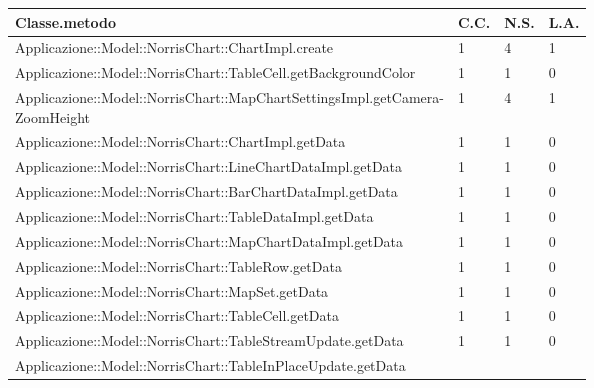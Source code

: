 
\begin{longtabu} spread 1cm [c]{|p{11cm}|p{1cm}|p{1cm}|p{1cm}|}
					\hline
					\rowfont{\bf \centering}
					Classe.metodo &
					C.C. &
					N.S.  &
					L.A. 
					\\
					\hline
					\endhead
            
					\parbox[t]{4cm}{Applicazione::Model::NorrisChart::ChartImpl.create} &
                1 &
                4 &
                1\\\hline \parbox[t]{4cm}{Applicazione::Model::NorrisChart::TableCell.getBackgroundColor} &
                1 &
                1 &
                0\\\hline \parbox[t]{4cm}{Applicazione::Model::NorrisChart::MapChartSettingsImpl.getCamera-\\ZoomHeight} &
                1 &
                4 &
                1\\\hline \parbox[t]{4cm}{Applicazione::Model::NorrisChart::ChartImpl.getData} &
                1 &
                1 &
                0\\\hline \parbox[t]{4cm}{Applicazione::Model::NorrisChart::LineChartDataImpl.getData} &
                1 &
                1 &
                0\\\hline \parbox[t]{4cm}{Applicazione::Model::NorrisChart::BarChartDataImpl.getData} &
                1 &
                1 &
                0\\\hline \parbox[t]{4cm}{Applicazione::Model::NorrisChart::TableDataImpl.getData} &
                1 &
                1 &
                0\\\hline \parbox[t]{4cm}{Applicazione::Model::NorrisChart::MapChartDataImpl.getData} &
                1 &
                1 &
                0\\\hline \parbox[t]{4cm}{Applicazione::Model::NorrisChart::TableRow.getData} &
                1 &
                1 &
                0\\\hline \parbox[t]{4cm}{Applicazione::Model::NorrisChart::MapSet.getData} &
                1 &
                1 &
                0\\\hline \parbox[t]{4cm}{Applicazione::Model::NorrisChart::TableCell.getData} &
                1 &
                1 &
                0\\\hline \parbox[t]{4cm}{Applicazione::Model::NorrisChart::TableStreamUpdate.getData} &
                1 &
                1 &
                0\\\hline \parbox[t]{4cm}{Applicazione::Model::NorrisChart::TableInPlaceUpdate.getData} &

\end{longtabu}
